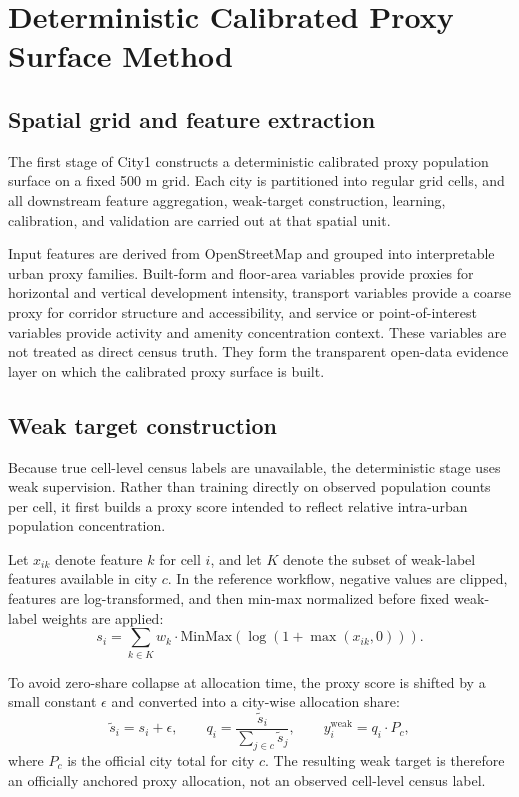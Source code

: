 \section{Deterministic Calibrated Proxy Surface Method}

\subsection{Spatial grid and feature extraction}

The first stage of City1 constructs a deterministic calibrated proxy population surface on a fixed 500 m grid. Each city is partitioned into regular grid cells, and all downstream feature aggregation, weak-target construction, learning, calibration, and validation are carried out at that spatial unit.

Input features are derived from OpenStreetMap and grouped into interpretable urban proxy families. Built-form and floor-area variables provide proxies for horizontal and vertical development intensity, transport variables provide a coarse proxy for corridor structure and accessibility, and service or point-of-interest variables provide activity and amenity concentration context. These variables are not treated as direct census truth. They form the transparent open-data evidence layer on which the calibrated proxy surface is built.

\subsection{Weak target construction}

Because true cell-level census labels are unavailable, the deterministic stage uses weak supervision. Rather than training directly on observed population counts per cell, it first builds a proxy score intended to reflect relative intra-urban population concentration.

Let $x_{ik}$ denote feature $k$ for cell $i$, and let $K$ denote the subset of weak-label features available in city $c$. In the reference workflow, negative values are clipped, features are log-transformed, and then min-max normalized before fixed weak-label weights are applied:
\[
s_i = \sum_{k \in K} w_k \cdot \mathrm{MinMax}\!\left(\log\!\left(1 + \max(x_{ik}, 0)\right)\right).
\]

To avoid zero-share collapse at allocation time, the proxy score is shifted by a small constant $\epsilon$ and converted into a city-wise allocation share:
\[
\tilde{s}_i = s_i + \epsilon,
\qquad
q_i = \frac{\tilde{s}_i}{\sum_{j \in c} \tilde{s}_j},
\qquad
y_i^{\mathrm{weak}} = q_i \cdot P_c,
\]
where $P_c$ is the official city total for city $c$. The resulting weak target is therefore an officially anchored proxy allocation, not an observed cell-level census label.

